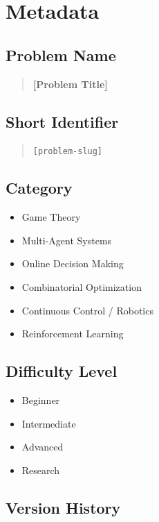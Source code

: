 \documentclass[11pt,a4paper]{article}
\newcommand{\problemname}{[Problem Title]}
\newcommand{\shortname}{[problem-slug]}
\begin{document}

\section{Metadata}

\subsection{Problem Name}
\begin{quote}
\textbf{\problemname}
\end{quote}

\subsection{Short Identifier}
\begin{quote}
\texttt{\shortname}
\end{quote}

\subsection{Category}
\begin{itemize}
    \item[$\square$] Game Theory
    \item[$\square$] Multi-Agent Systems
    \item[$\square$] Online Decision Making
    \item[$\square$] Combinatorial Optimization
    \item[$\square$] Continuous Control / Robotics
    \item[$\square$] Reinforcement Learning
\end{itemize}

\subsection{Difficulty Level}
\begin{itemize}
    \item[$\square$] Beginner
    \item[$\square$] Intermediate
    \item[$\square$] Advanced
    \item[$\square$] Research
\end{itemize}

\subsection{Version History}
\end{document}
